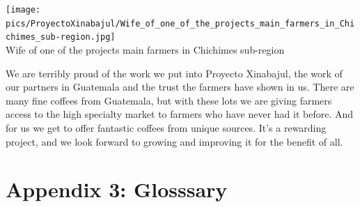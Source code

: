 \documentclass[10pt,twoside,footinclude=true,headinclude=true]{scrbook} %
\begin{document}
\begin{center}
	\texttt{[image: pics/ProyectoXinabajul/Wife\_of\_one\_of\_the\_projects\_main\_farmers\_in\_Chichimes\_sub-region.jpg]} \\
	\scriptsize
	Wife of one of the projects main farmers in Chichimes sub-region
\end{center}
We are terribly proud of the work we put into Proyecto Xinabajul, the work of our partners in Guatemala and the trust the farmers have shown in us. There are many fine coffees from Guatemala, but with these lots we are giving farmers access to the high specialty market to farmers who have never had it before. And for us we get to offer fantastic coffees from unique sources. It's a rewarding project, and we look forward to growing and improving it for the benefit of all.\\

\chapter*{Appendix 3: Glosssary}
\scriptsize
\end{document}
